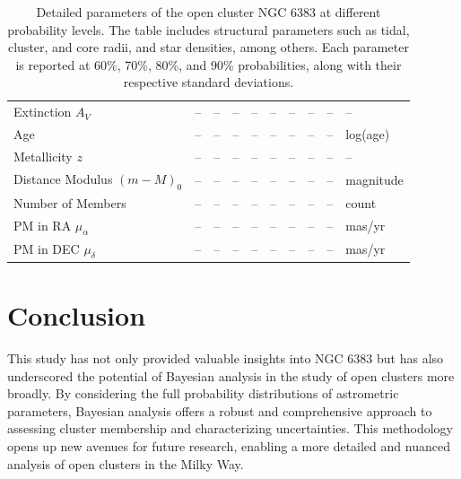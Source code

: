 \documentclass[fleqn,usenatbib,usedcolumn,useAMS]{mnras}
\begin{document}
\begin{table}
{\begin{tabular}{@{}llllllllll@{}}
			Extinction \( A_V \)               & --          & --          & --          & --         & --       & --      & --      & --      & --                 \\
			Age                                & --          & --          & --          & --         & --       & --      & --      & --      & log(age)           \\
			Metallicity \( z \)                & --          & --          & --          & --         & --       & --      & --      & --      & --                 \\
			Distance Modulus \( (m-M)_0 \)     & --          & --          & --          & --         & --       & --      & --      & --      & magnitude          \\
			Number of Members                  & --          & --          & --          & --         & --       & --      & --      & --      & count              \\
			PM in RA \( \mu_\alpha \)          & --          & --          & --          & --         & --       & --      & --      & --      & mas/yr             \\
			PM in DEC \( \mu_\delta \)         & --          & --          & --          & --         & --       & --      & --      & --      & mas/yr             \\ \bottomrule
		\end{tabular}%
	}
	\caption{Detailed parameters of the open cluster NGC 6383 at different probability levels. The table includes structural parameters such as tidal, cluster, and core radii, and star densities, among others. Each parameter is reported at 60\%, 70\%, 80\%, and 90\% probabilities, along with their respective standard deviations.}
	\label{tab:results_probs}
\end{table}

\section{Conclusion}\label{conclusions}

This study has not only provided valuable insights into NGC 6383 but has also underscored the potential of Bayesian analysis in the study of open clusters more broadly. By considering the full probability distributions of astrometric parameters, Bayesian analysis offers a robust and comprehensive approach to assessing cluster membership and characterizing uncertainties. This methodology opens up new avenues for future research, enabling a more detailed and nuanced analysis of open clusters in the Milky Way.
\end{document}
